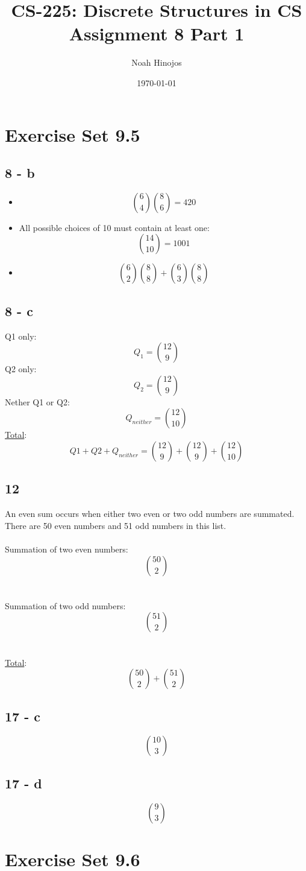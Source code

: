 \documentclass[12pt]{article}
\title{
  \textbf{CS-225: Discrete Structures in CS} \\
  Assignment 8 Part 1
  }
\author{Noah Hinojos}
\date{\today}
\begin{document}
\maketitle
\section*{Exercise Set 9.5}
\subsection*{8 - b}
\begin{itemize}
  \item [i.] $$\binom{6}{4}\binom{8}{6} = 420$$
  \item [ii.] All possible choices of 10 must contain at least one: $$\binom{14}{10} = 1001$$
  \item [iii.] $$\binom{6}{2}\binom{8}{8} + \binom{6}{3}\binom{8}{8}$$ 
\end{itemize}
\subsection*{8 - c}
Q1 only: $$ Q_1 = \binom{12}{9}$$
Q2 only: $$ Q_2 = \binom{12}{9}$$
Nether Q1 or Q2: $$ Q_{neither} = \binom{12}{10}$$
\underline{Total}:$$Q1 + Q2 + Q_{neither} = \binom{12}{9} + \binom{12}{9} + \binom{12}{10}$$
\subsection*{12}
An even sum occurs when either two even or two odd numbers are summated. 
There are 50 even numbers and 51 odd numbers in this list.
\\ \\
Summation of two even numbers: $$\binom{50}{2}$$
\\ \\
Summation of two odd numbers: $$\binom{51}{2}$$
\\ \\
\underline{Total}: $$\binom{50}{2} + \binom{51}{2}$$
\subsection*{17 - c}
$$\binom{10}{3}$$
\subsection*{17 - d}
$$\binom{9}{3}$$
\section*{Exercise Set 9.6}
\end{document}
